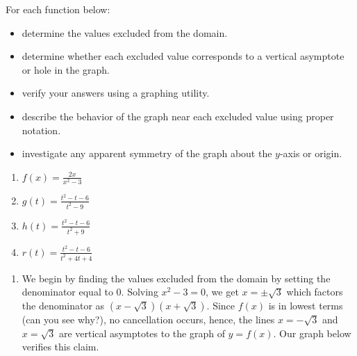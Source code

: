 \documentclass{ximera}
\begin{document}
\begin{example}  \label{vavsholeexample}  For each function below:

\begin{itemize}

\item  determine the values excluded from the domain.

\item   determine whether each excluded value corresponds to a vertical asymptote or hole in the graph.

\item  verify your answers using a graphing utility.

\item  describe the behavior of the graph near each excluded value using proper notation.  

\item  investigate any apparent symmetry of the graph about the $y$-axis or origin.

\end{itemize}

\begin{enumerate}

\item  $f(x) = \frac{2x}{x^2-3}$

\item  $g(t) = \frac{t^2-t-6}{t^2-9}$

\item  $h(t) = \frac{t^2-t-6}{t^2+9}$

\item  $r(t) = \frac{t^2-t-6}{t^2+4t+4}$

\end{enumerate}

\begin{explanation}

\begin{enumerate}

\item  We begin by finding the values excluded from the domain by setting the denominator equal to $0$.  Solving $x^2 - 3 = 0$, we get $x = \pm \sqrt{3}$ which factors the denominator as $(x-\sqrt{3})(x+\sqrt{3})$.  Since  $f(x)$ is in lowest terms (can you see why?), no cancellation occurs,   hence,  the lines $x = -\sqrt{3}$ and $x=\sqrt{3}$ are vertical asymptotes to the graph of $y=f(x)$.  Our graph below verifies this claim.

\begin{center}
\end{center} 


\end{enumerate}
\end{explanation}
\end{example}
\end{document}
